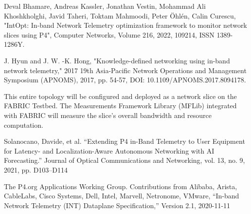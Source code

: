 \documentclass[conference]{IEEEtran}
\begin{document}
\begin{thebibliography}{00}
 Deval Bhamare, Andreas Kassler, Jonathan Vestin, Mohammad Ali Khoshkholghi, Javid Taheri, Toktam Mahmoodi, Peter Öhlén, Calin Curescu, "IntOpt: In-band Network Telemetry optimization framework to monitor network slices using P4", Computer Networks, Volume 216, 2022, 109214, ISSN 1389-1286Y. 

 J. Hyun and J. W. -K. Hong, "Knowledge-defined networking using in-band network telemetry," 2017 19th Asia-Pacific Network Operations and Management Symposium (APNOMS), 2017, pp. 54-57, DOI: 10.1109/APNOMS.2017.8094178.

 This entire topology will be configured and deployed as a network slice on the FABRIC Testbed. The Measurements Framework Library (MFLib) integrated with FABRIC will measure the slice's overall bandwidth and resource computation.

 Solanocano, Davide, et al. “Extending P4 in-Band Telemetry to User Equipment for Latency- and Localization-Aware Autonomous Networking with AI Forecasting.” Journal of Optical Communications and Networking, vol. 13, no. 9, 2021, pp. D103–D114

 The P4.org Applications Working Group. Contributions from Alibaba, Arista, CableLabs, Cisco Systems, Dell, Intel, Marvell, Netronome, VMware, “In-band Network Telemetry (INT) Dataplane Specification,” Version 2.1, 2020-11-11

\end{thebibliography}
\end{document}
